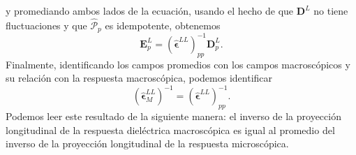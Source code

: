 \documentclass[12pt]{article}
\begin{document}
y promediando ambos lados de la ecuación, usando el hecho de que $\bm
D^L$ no tiene fluctuaciones y que $\hat{\mathcal P}_p$ es idempotente,
obtenemos
\begin{equation}
  \label{eq:ELpvsDLp}
  \bm E^L_p=(\hat{\bm\epsilon}^{LL})^{-1}_{pp}\bm D^L_p.
\end{equation}
Finalmente, identificando los campos promedios con los campos
macroscópicos y su relación con la respuesta macroscópica,
podemos identificar\cite{ElectromagneticResponseofSystemwithSpatialFluctuations}
\begin{equation}
  \label{eq:epsLLM}
  (\hat{\bm \epsilon}_M^{LL})^{-1}=(\hat{\bm\epsilon}^{LL})^{-1}_{pp}.
\end{equation}
Podemos leer este resultado de la siguiente manera: el inverso de la
proyección longitudinal de la respuesta dieléctrica macroscópica es
igual al promedio del inverso de la proyección longitudinal de la
respuesta microscópica.\cite{guilleOE}
\end{document}
